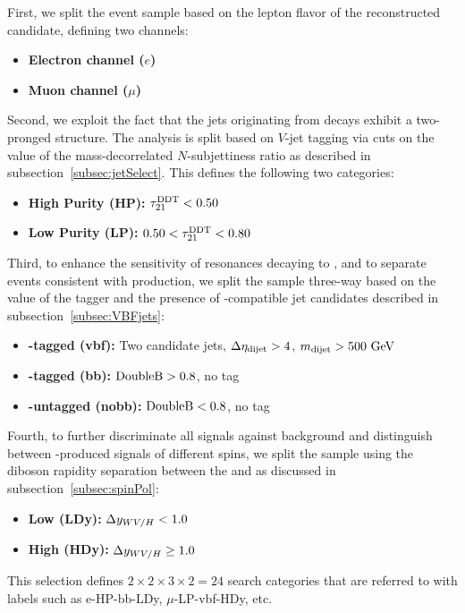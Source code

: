 First, we split the event sample based on the lepton flavor of the reconstructed \Wlep candidate, defining two channels:
\begin{itemize}
  \item {\bfseries Electron channel ($e$)}
  \item {\bfseries Muon channel ($\mu$)}
\end{itemize}

Second, we exploit the fact that the jets originating from \VorH decays exhibit a two-pronged structure.
The analysis is split based on $V$-jet tagging via cuts on the value of the mass-decorrelated $N$-subjettiness ratio \nsubjDDT as described in subsection~\ref{subsec:jetSelect}.
This defines the following two categories:
\begin{itemize}
  \item {\bfseries High Purity (HP):} $\nsubjDDT<0.50$
  \item {\bfseries Low Purity (LP):} $0.50<\nsubjDDT<0.80$
\end{itemize}

Third, to enhance the sensitivity of resonances decaying to \WHtolnubbbar, and to separate events consistent with \VBF production, we split the sample three-way based on the value of the \DoubleB tagger and the presence of \VBF-compatible jet candidates described in subsection~\ref{subsec:VBFjets}:
\begin{itemize}
  \item {\bfseries \VBF-tagged (vbf):} Two candidate \VBF jets, $\DetaVBF>4$, $\mjjVBF>500\unit{GeV}$
  \item {\bfseries \bbbar-tagged (bb):} $\DoubleB>0.8$, no \VBF tag
  \item {\bfseries \bbbar-untagged (nobb):} $\DoubleB<0.8$, no \VBF tag
\end{itemize}

Fourth, to further discriminate all signals against background and distinguish between \VBF-produced signals of different spins, we split the sample using the diboson rapidity separation \Dy between the \Wlep and \Vhad as discussed in subsection~\ref{subsec:spinPol}:
\begin{itemize}
  \item {\bfseries Low \Dy (LDy):} $\Dy<1.0$
  \item {\bfseries High \Dy (HDy):} $\Dy\geq1.0$
\end{itemize}

This selection defines $2\times2\times3\times2=24$ search categories that are referred to with labels such as e-HP-bb-LDy, $\mu$-LP-vbf-HDy, etc.
